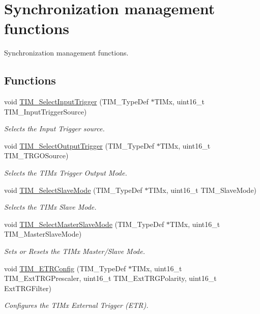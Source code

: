 \hypertarget{group___t_i_m___group7}{\section{Synchronization management functions}
\label{group___t_i_m___group7}
}


Synchronization management functions.  


\subsection*{Functions}
\begin{DoxyCompactItemize}
\item 
void \hyperlink{group___t_i_m___group7_ga4252583c6ae8a73d6fc66f7e951dbc35}{T\-I\-M\-\_\-\-Select\-Input\-Trigger} (T\-I\-M\-\_\-\-Type\-Def $\ast$T\-I\-Mx, uint16\-\_\-t T\-I\-M\-\_\-\-Input\-Trigger\-Source)
\begin{DoxyCompactList}\small\item\em Selects the Input Trigger source. \end{DoxyCompactList}\item 
void \hyperlink{group___t_i_m___group7_ga28745aaa549e2067e42c19569209e6c6}{T\-I\-M\-\_\-\-Select\-Output\-Trigger} (T\-I\-M\-\_\-\-Type\-Def $\ast$T\-I\-Mx, uint16\-\_\-t T\-I\-M\-\_\-\-T\-R\-G\-O\-Source)
\begin{DoxyCompactList}\small\item\em Selects the T\-I\-Mx Trigger Output Mode. \end{DoxyCompactList}\item 
void \hyperlink{group___t_i_m___group7_ga2f19ce1d90990691cf037e419ba08003}{T\-I\-M\-\_\-\-Select\-Slave\-Mode} (T\-I\-M\-\_\-\-Type\-Def $\ast$T\-I\-Mx, uint16\-\_\-t T\-I\-M\-\_\-\-Slave\-Mode)
\begin{DoxyCompactList}\small\item\em Selects the T\-I\-Mx Slave Mode. \end{DoxyCompactList}\item 
void \hyperlink{group___t_i_m___group7_ga4dcc3d11b670c381d0ff9cb7e9fd01e2}{T\-I\-M\-\_\-\-Select\-Master\-Slave\-Mode} (T\-I\-M\-\_\-\-Type\-Def $\ast$T\-I\-Mx, uint16\-\_\-t T\-I\-M\-\_\-\-Master\-Slave\-Mode)
\begin{DoxyCompactList}\small\item\em Sets or Resets the T\-I\-Mx Master/\-Slave Mode. \end{DoxyCompactList}\item 
void \hyperlink{group___t_i_m___group7_ga8bdde400b7a30f3e747fe8e4962c0abe}{T\-I\-M\-\_\-\-E\-T\-R\-Config} (T\-I\-M\-\_\-\-Type\-Def $\ast$T\-I\-Mx, uint16\-\_\-t T\-I\-M\-\_\-\-Ext\-T\-R\-G\-Prescaler, uint16\-\_\-t T\-I\-M\-\_\-\-Ext\-T\-R\-G\-Polarity, uint16\-\_\-t Ext\-T\-R\-G\-Filter)
\begin{DoxyCompactList}\small\item\em Configures the T\-I\-Mx External Trigger (E\-T\-R). \end{DoxyCompactList}\end{DoxyCompactItemize}


